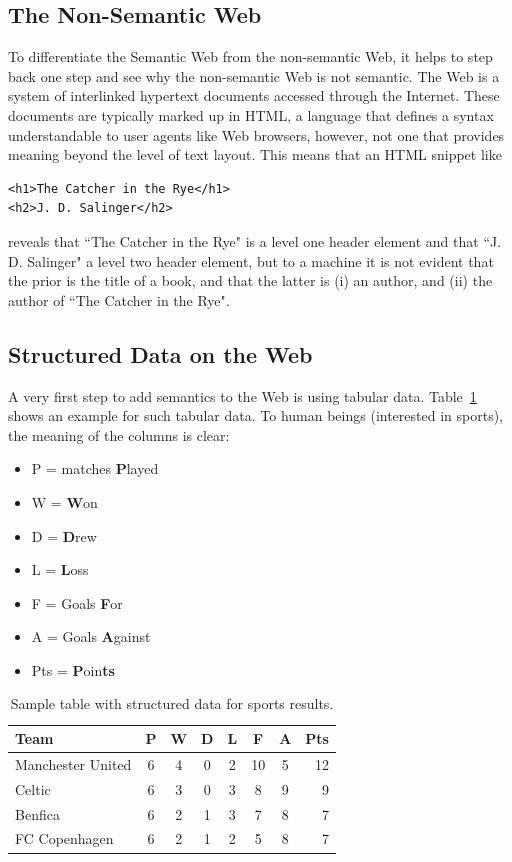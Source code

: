 \documentclass[12pt]{article}
\begin{document}
\subsection{The Non-Semantic Web}
To differentiate the Semantic Web from the non-semantic Web, it helps to step back one step and see why the non-semantic Web is not semantic. The Web is a system of interlinked hypertext documents accessed through the Internet. These documents are typically marked up in HTML, a language that defines a syntax understandable to user agents like Web browsers, however, not one that provides meaning beyond the level of text layout. This means that an HTML snippet like
\begin{verbatim}
<h1>The Catcher in the Rye</h1>
<h2>J. D. Salinger</h2>
\end{verbatim}
 reveals that ``The Catcher in the Rye" is a level one header element and that ``J. D. Salinger" a level two header element, but to a machine it is not evident that the prior is the title of a book, and that the latter is (i) an author, and (ii) the author of ``The Catcher in the Rye".

\subsection{Structured Data on the Web}
A very first step to add semantics to the Web is using tabular data. Table~\ref{tab:sample-table-structured-data} shows an example for such tabular data. To human beings (interested in sports), the meaning of the columns is clear:
\begin{itemize}
\item P = matches \textbf{P}layed
\item W = \textbf{W}on 
\item D = \textbf{D}rew
\item L = \textbf{L}oss
\item F = Goals \textbf{F}or
\item A = Goals \textbf{A}gainst
\item Pts = \textbf{P}oin\textbf{ts}
\end{itemize}

\begin{table}[htbp]
 \begin{center}
  \begin{tabular}{l*{6}{c}r}
Team              & P & W & D & L & F  & A & Pts \\
\hline
Manchester United & 6 & 4 & 0 & 2 & 10 & 5 & 12  \\
Celtic            & 6 & 3 & 0 & 3 &  8 & 9 &  9  \\
Benfica           & 6 & 2 & 1 & 3 &  7 & 8 &  7  \\
FC Copenhagen     & 6 & 2 & 1 & 2 &  5 & 8 &  7  \\
  \end{tabular}
\caption{Sample table with structured data for sports results.}
\label{tab:sample-table-structured-data}
 \end{center}
\end{table}
\end{document}
